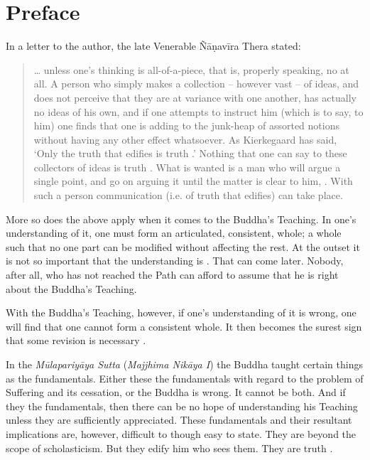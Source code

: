 \chapter{Preface}

In a letter to the author, the late Venerable Ñāṇavīra Thera stated:

\begin{quote}
\ldots{} unless one's thinking is all-of-a-piece, that is, properly speaking, no  at all. A person who simply makes a collection -- however vast -- of ideas, and does not perceive that they are at variance with one another, has actually no ideas of his own, and if one attempts to instruct him (which is to say, to  him) one finds that one is adding to the junk-heap of assorted notions without having any other effect whatsoever. As Kierkegaard has said, `Only the truth that edifies is truth .' Nothing that one can say to these collectors of ideas is truth . What is wanted is a man who will argue a single point, and go on arguing it until the matter is clear to him, . With such a person communication (i.e. of truth that edifies) can take place.
\end{quote}

More so does the above apply when it comes to the Buddha's Teaching. In one's understanding of it, one must form an articulated, consistent, whole; a whole such that no one part can be modified without affecting the rest. At the outset it is not so important that the understanding is . That can  come later. Nobody, after all, who has not reached the Path can afford to assume that he is right about the Buddha's Teaching.

With the Buddha's Teaching, however, if one's understanding of it is wrong, one will find that one cannot form a consistent whole. It then becomes the surest sign that some revision is necessary .

In the \emph{Mūlapariyāya Sutta} (\emph{Majjhima Nikāya I}) the Buddha taught certain things as the fundamentals. Either these  the fundamentals with regard to the problem of Suffering and its cessation, or the Buddha is wrong. It cannot be both. And if they  the fundamentals, then there can be no hope of understanding his Teaching unless they are sufficiently appreciated. These fundamentals and their resultant implications are, however, difficult to  though easy to state. They are beyond the scope of scholasticism. But they edify him who sees them. They are truth .

